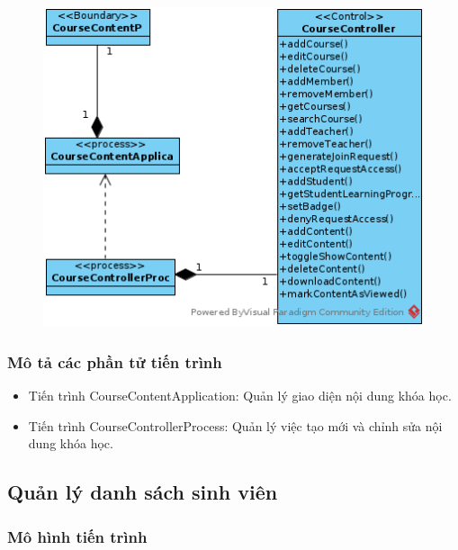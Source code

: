 \documentclass[./../main_file.tex]{subfiles}
\begin{document}
\begin{figure}[H]
	\centering
	\includegraphics[width=\linewidth]{./images/pv_manage_contentcourse.png}
\end{figure}

\subsubsection{Mô tả các phần tử tiến trình}
\begin{itemize}
	\item Tiến trình CourseContentApplication: Quản lý giao diện nội dung khóa học.
	\item Tiến trình CourseControllerProcess: Quản lý việc tạo mới và chỉnh sửa nội dung khóa học.
\end{itemize}

\subsection{Quản lý danh sách sinh viên}

\subsubsection{Mô hình tiến trình}
\end{document}
